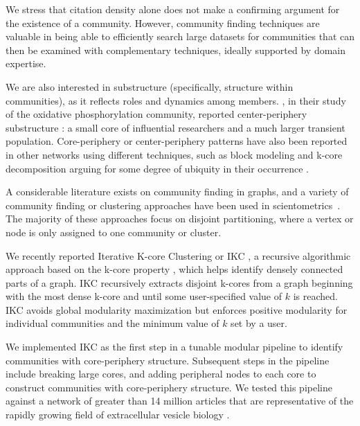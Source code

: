 \documentclass[12pt, oneside]{article}   	%
\begin{document}
We stress that citation density alone does not make a confirming argument for the existence of a community. However, community finding techniques are valuable in being able to efficiently search large datasets for communities that can then be examined with complementary techniques, ideally supported by domain expertise.

We are also interested in substructure (specifically, structure within communities), as it reflects roles and dynamics among members. \cite{Price1966}, in their study of the oxidative phosphorylation community, reported center-periphery substructure \citep{Breiger2014}: a small core of influential researchers and a much larger transient population. Core-periphery or center-periphery patterns have also been reported in other networks using different techniques, such as block modeling and k-core decomposition arguing for some degree of ubiquity in their occurrence \citep{borgatti2000models,Rombach2017,gallagher2021clarified,yanchenko_2202.04455}. 

A considerable literature exists on community finding in graphs, and a variety of community finding or clustering approaches have been used in scientometrics~\citep{Newman2006,Fortunato2009,Boyack2010,Boyack2019,Traag2019,Ahlgren2020,Chandrasekharan2021,Wedell2022}. The majority of these approaches focus on disjoint partitioning, where a vertex or node is only assigned to one community or cluster.

We recently reported Iterative K-core Clustering or IKC \citep{Wedell2022}, a recursive algorithmic approach based on the k-core property \citep{Giatsidis2011,malliaros2019}, which helps identify densely connected parts of a graph. IKC recursively extracts disjoint k-cores from a graph beginning with the most dense  k-core and until some user-specified value of $k$ is reached. IKC avoids global modularity maximization \citep{lancichinetti2011limits} but enforces positive modularity for individual communities and the minimum value of $k$ set by a user. 

We implemented IKC as the first step in a tunable modular pipeline to identify communities with core-periphery structure. Subsequent steps in the pipeline include breaking large cores, and adding peripheral nodes to each core to construct communities with core-periphery structure. We tested this pipeline against a network of greater than 14 million articles that are representative of the rapidly growing field of extracellular vesicle biology \citep{Wedell2022}. 
\end{document}
